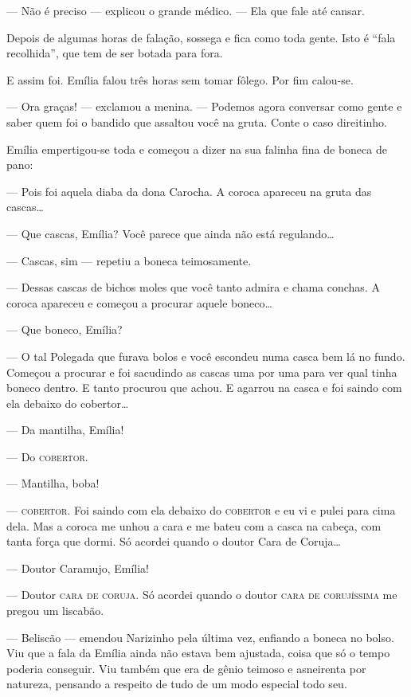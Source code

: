 --- Não é preciso --- explicou o grande médico. --- Ela que fale até
cansar.

Depois de algumas horas de falação, sossega e fica como toda gente. Isto
é ``fala recolhida'', que tem de ser botada para fora.

E assim foi. Emília falou três horas sem tomar fôlego. Por fim calou-se.

--- Ora graças! --- exclamou a menina. --- Podemos agora conversar como
gente e saber quem foi o bandido que assaltou você na gruta. Conte o
caso direitinho.

Emília empertigou-se toda e começou a dizer na sua falinha fina de
boneca de pano:

--- Pois foi aquela diaba da dona Carocha. A coroca apareceu na gruta
das cascas\ldots{}

--- Que cascas, Emília? Você parece que ainda não está regulando\ldots{}

--- Cascas, sim --- repetiu a boneca teimosamente.

--- Dessas cascas de bichos moles que você tanto admira e chama conchas.
A coroca apareceu e começou a procurar aquele boneco\ldots{}

--- Que boneco, Emília?

--- O tal Polegada que furava bolos e você escondeu numa casca bem lá no
fundo. Começou a procurar e foi sacudindo as cascas uma por uma para ver
qual tinha boneco dentro. E tanto procurou que achou. E agarrou na casca
e foi saindo com ela debaixo do cobertor\ldots{}

--- Da mantilha, Emília!

--- Do \textsc{cobertor}.

--- Mantilha, boba!

--- \textsc{cobertor}. Foi saindo com ela debaixo do \textsc{cobertor} e eu vi e pulei
para cima dela. Mas a coroca me unhou a cara e me bateu com a casca na
cabeça, com tanta força que dormi. Só acordei quando o doutor Cara de
Coruja\ldots{}

--- Doutor Caramujo, Emília!

--- Doutor \textsc{cara de coruja}. Só acordei quando o doutor \textsc{cara de
corujíssima} me pregou um liscabão.

--- Beliscão --- emendou Narizinho pela última vez, enfiando a boneca no
bolso. Viu que a fala da Emília ainda não estava bem ajustada, coisa que
só o tempo poderia conseguir. Viu também que era de gênio teimoso e
asneirenta por natureza, pensando a respeito de tudo de um modo especial
todo seu.

